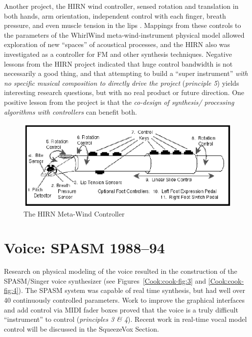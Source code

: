 Another project, the HIRN wind controller, sensed rotation and translation in
both hands, arm orientation, independent control with each finger, breath
pressure, and even muscle tension in the lips \cite{Cook:1992}.  Mappings from these controls
to the parameters of the WhirlWind meta-wind-instrument physical model allowed
exploration of new ``spaces'' of acoustical processes, and the HIRN also was
investigated as a controller for FM and other synthesis techniques.  Negative
lessons from the HIRN project indicated that huge control bandwidth is not
necessarily a good thing, and that attempting to build a ``super instrument''
\textit{with no specific musical composition to directly drive the project}
(\textit{principle 5}) yields interesting research questions, but with no real
product or future direction.   One positive lesson from the project is that the
\textit{co-design of synthesis/ processing algorithms with controllers} can
benefit both.

\begin{figure}[t]
\centering
\includegraphics[width=\textwidth]{img-1-eps-converted-to-crop.pdf}
\caption{The HIRN Meta-Wind Controller}
\label{Cook:cook-fig:2}       %
\end{figure}


\section{Voice:  SPASM  1988--94   }

Research on physical modeling of the voice resulted in the construction of the
SPASM/Singer voice synthesizer  \cite{Cook:1991,Cook:1992a} (see Figures~\ref{Cook:cook-fig:3} and \ref{Cook:cook-fig:4}).  The SPASM system
was capable of real time synthesis, but had well over 40 continuously controlled
parameters.  Work to improve the graphical interfaces and add control via MIDI
fader boxes \cite{Cook:1993a} proved that the voice is a truly difficult ``instrument'' to
control (\textit{principles 3 \& 4}).  Recent work in real-time vocal model
control will be discussed in the SqueezeVox Section.


